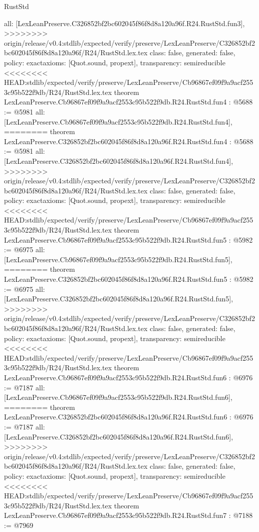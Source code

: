 \begin{lexlean}{RustStd}
\begin{coremodule}
{\begin{coremodule}
{{{{{{{  all: [LexLeanPreserve.C326852bf2bc602045f86f8d8a120a96f.R24.RustStd.fun3],
>>>>>>>> origin/release/v0.4:stdlib/expected/verify/preserve/LexLeanPreserve/C326852bf2bc602045f86f8d8a120a96f/R24/RustStd.lex.tex
  class: false,
  generated: false,
  policy: exact{axioms: [Quot.sound, propext]},
  transparency: semireducible
}
<<<<<<<< HEAD:stdlib/expected/verify/preserve/LexLeanPreserve/Cb96867ef09f9a9acf2553c95b522f9db/R24/RustStd.lex.tex
theorem LexLeanPreserve.Cb96867ef09f9a9acf2553c95b522f9db.R24.RustStd.fun4 : @5688 := @5981 {
  all: [LexLeanPreserve.Cb96867ef09f9a9acf2553c95b522f9db.R24.RustStd.fun4],
========
theorem LexLeanPreserve.C326852bf2bc602045f86f8d8a120a96f.R24.RustStd.fun4 : @5688 := @5981 {
  all: [LexLeanPreserve.C326852bf2bc602045f86f8d8a120a96f.R24.RustStd.fun4],
>>>>>>>> origin/release/v0.4:stdlib/expected/verify/preserve/LexLeanPreserve/C326852bf2bc602045f86f8d8a120a96f/R24/RustStd.lex.tex
  class: false,
  generated: false,
  policy: exact{axioms: [Quot.sound, propext]},
  transparency: semireducible
}
<<<<<<<< HEAD:stdlib/expected/verify/preserve/LexLeanPreserve/Cb96867ef09f9a9acf2553c95b522f9db/R24/RustStd.lex.tex
theorem LexLeanPreserve.Cb96867ef09f9a9acf2553c95b522f9db.R24.RustStd.fun5 : @5982 := @6975 {
  all: [LexLeanPreserve.Cb96867ef09f9a9acf2553c95b522f9db.R24.RustStd.fun5],
========
theorem LexLeanPreserve.C326852bf2bc602045f86f8d8a120a96f.R24.RustStd.fun5 : @5982 := @6975 {
  all: [LexLeanPreserve.C326852bf2bc602045f86f8d8a120a96f.R24.RustStd.fun5],
>>>>>>>> origin/release/v0.4:stdlib/expected/verify/preserve/LexLeanPreserve/C326852bf2bc602045f86f8d8a120a96f/R24/RustStd.lex.tex
  class: false,
  generated: false,
  policy: exact{axioms: [Quot.sound, propext]},
  transparency: semireducible
}
<<<<<<<< HEAD:stdlib/expected/verify/preserve/LexLeanPreserve/Cb96867ef09f9a9acf2553c95b522f9db/R24/RustStd.lex.tex
theorem LexLeanPreserve.Cb96867ef09f9a9acf2553c95b522f9db.R24.RustStd.fun6 : @6976 := @7187 {
  all: [LexLeanPreserve.Cb96867ef09f9a9acf2553c95b522f9db.R24.RustStd.fun6],
========
theorem LexLeanPreserve.C326852bf2bc602045f86f8d8a120a96f.R24.RustStd.fun6 : @6976 := @7187 {
  all: [LexLeanPreserve.C326852bf2bc602045f86f8d8a120a96f.R24.RustStd.fun6],
>>>>>>>> origin/release/v0.4:stdlib/expected/verify/preserve/LexLeanPreserve/C326852bf2bc602045f86f8d8a120a96f/R24/RustStd.lex.tex
  class: false,
  generated: false,
  policy: exact{axioms: [Quot.sound, propext]},
  transparency: semireducible
}
<<<<<<<< HEAD:stdlib/expected/verify/preserve/LexLeanPreserve/Cb96867ef09f9a9acf2553c95b522f9db/R24/RustStd.lex.tex
theorem LexLeanPreserve.Cb96867ef09f9a9acf2553c95b522f9db.R24.RustStd.fun7 : @7188 := @7969 {
}}}}}}}}}}
\end{coremodule}}
\end{coremodule}
\end{lexlean}
